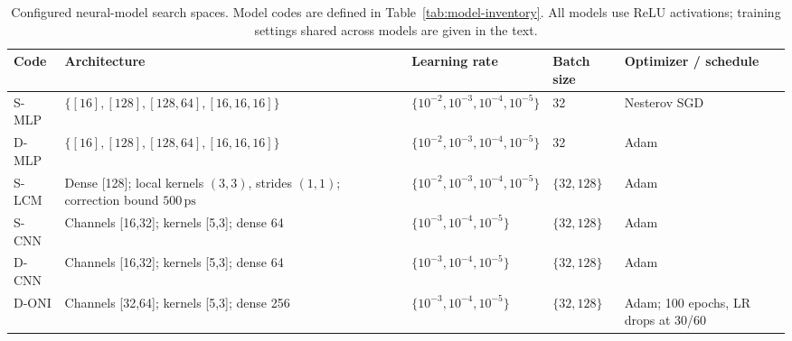\begin{table}[tbp]
\centering
\footnotesize
\begin{tabularx}{\textwidth}{@{}p{}Xp{}p{}p{}@{}}
\toprule
Code & Architecture & Learning rate & Batch size & Optimizer / schedule \\
\midrule
S-MLP
& $\{[16],[128],[128,64],[16,16,16]\}$
& $\{10^{-2},10^{-3},10^{-4},10^{-5}\}$
& 32
& Nesterov SGD \\

D-MLP
& $\{[16],[128],[128,64],[16,16,16]\}$
& $\{10^{-2},10^{-3},10^{-4},10^{-5}\}$
& 32
& Adam \\

S-LCM
& Dense [128]; local kernels $(3,3)$, strides $(1,1)$; correction bound $500\,\mathrm{ps}$
& $\{10^{-2},10^{-3},10^{-4},10^{-5}\}$
& $\{32,128\}$
& Adam \\

S-CNN
& Channels [16,32]; kernels [5,3]; dense 64
& $\{10^{-3},10^{-4},10^{-5}\}$
& $\{32,128\}$
& Adam \\

D-CNN
& Channels [16,32]; kernels [5,3]; dense 64
& $\{10^{-3},10^{-4},10^{-5}\}$
& $\{32,128\}$
& Adam \\

D-ONI
& Channels [32,64]; kernels [5,3]; dense 256
& $\{10^{-3},10^{-4},10^{-5}\}$
& $\{32,128\}$
& Adam; 100 epochs, LR drops at 30/60 \\
\bottomrule
\end{tabularx}
\caption{Configured neural-model search spaces. Model codes are defined in
Table~\ref{tab:model-inventory}. All models use ReLU activations; training
settings shared across models are given in the text.}
\label{tab:space-neural-summary}
\end{table}